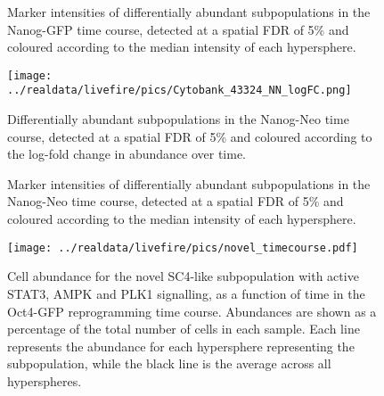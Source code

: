 \documentclass{article}
\begin{document}
\begin{figure}[p]
    \begin{center}
    \end{center}
    \caption{
        Marker intensities of differentially abundant subpopulations in the Nanog-GFP time course, detected at a spatial FDR of 5\% and coloured according to the median intensity of each hypersphere.
    }
\end{figure}

\begin{figure}[p]
    \begin{center}
    \texttt{[image: ../realdata/livefire/pics/Cytobank\_43324\_NN\_logFC.png]}
    \end{center}
    \caption{
        Differentially abundant subpopulations in the Nanog-Neo time course, detected at a spatial FDR of 5\% and coloured according to the log-fold change in abundance over time.
    }
\end{figure}

\begin{figure}[p]
    \begin{center}
    \end{center}
    \caption{
        Marker intensities of differentially abundant subpopulations in the Nanog-Neo time course, detected at a spatial FDR of 5\% and coloured according to the median intensity of each hypersphere.
    }
\end{figure}

\begin{figure}[p]
    \begin{center}
        \texttt{[image: ../realdata/livefire/pics/novel\_timecourse.pdf]}
    \end{center}
    \caption{
        Cell abundance for the novel SC4-like subpopulation with active STAT3, AMPK and PLK1 signalling, as a function of time in the Oct4-GFP reprogramming time course.
        Abundances are shown as a percentage of the total number of cells in each sample.
        Each line represents the abundance for each hypersphere representing the subpopulation, while the black line is the average across all hyperspheres.
    }
\end{figure}
\end{document}
